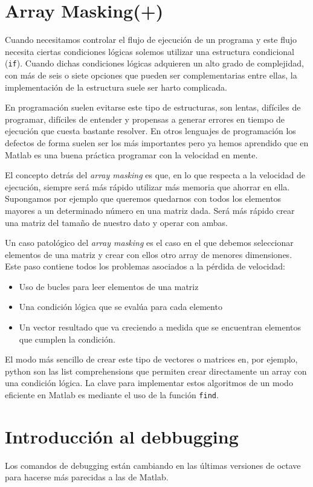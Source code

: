 \section{Array Masking(+)}

Cuando necesitamos controlar el flujo de ejecución de un programa y este
flujo necesita ciertas condiciones lógicas solemos utilizar una 
estructura condicional (\texttt{if}).  Cuando dichas condiciones lógicas
adquieren un alto grado de complejidad, con más de seis o siete opciones
que pueden ser complementarias entre ellas, la implementación de la
estructura suele ser harto complicada.

En programación suelen evitarse este tipo de estructuras, son lentas,
difíciles de programar, difíciles de entender y propensas a generar
errores en tiempo de ejecución que cuesta bastante resolver. En otros
lenguajes de programación los defectos de forma suelen ser los más
importantes pero ya hemos aprendido que en Matlab es una buena práctica
programar con la velocidad en mente.

El concepto detrás del \emph{array masking} es que, en lo que respecta
a la velocidad de ejecución, siempre será más rápido utilizar más
memoria que ahorrar en ella.  Supongamos por ejemplo que queremos
quedarnos con todos los elementos mayores a un determinado número en
una matriz dada. Será más rápido crear una matriz del tamaño de
nuestro dato y operar con ambas.

Un caso patológico del \emph{array masking} es el caso en el que
debemos seleccionar elementos de una matriz y crear con ellos otro
array de menores dimensiones. Este paso contiene todos los problemas
asociados a la pérdida de velocidad:
\begin{itemize}
\item Uso de bucles para leer elementos de una matriz
\item Una condición lógica que se evalúa para cada elemento
\item Un vector resultado que va creciendo a medida que se encuentran
  elementos que cumplen la condición.
\end{itemize}

El modo más sencillo de crear este tipo de vectores o matrices en, por
ejemplo, python son las list comprehensions que permiten crear
directamente un array con una condición lógica.  La clave para
implementar estos algoritmos de un modo eficiente en Matlab es
mediante el uso de la función \texttt{find}.

\section{Introducción al debbugging}
Los comandos de debugging están cambiando en las últimas versiones de
octave para hacerse más parecidas a las de Matlab.

